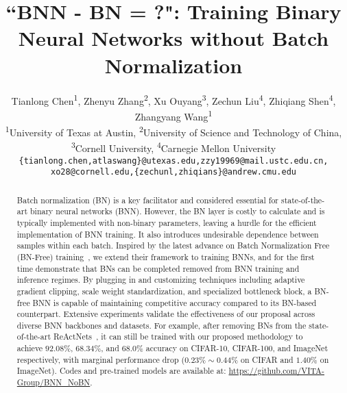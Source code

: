 \documentclass[final]{cvpr}
\newcommand{\PaperTitle}{``BNN - BN = ?": Training Binary Neural Networks without Batch Normalization}
\begin{document}
\title{\PaperTitle}

\author{Tianlong Chen\textsuperscript{1}, Zhenyu Zhang\textsuperscript{2}, Xu Ouyang\textsuperscript{3}, Zechun Liu\textsuperscript{4}, Zhiqiang Shen\textsuperscript{4}, Zhangyang Wang\textsuperscript{1}\\
  \textsuperscript{1}University of Texas at Austin, \textsuperscript{2}University of Science and Technology of China, \\ \textsuperscript{3}Cornell University, \textsuperscript{4}Carnegie Mellon University \\
  \small{\texttt{\{tianlong.chen,atlaswang\}@utexas.edu,zzy19969@mail.ustc.edu.cn,}} \\
  \small{\texttt{xo28@cornell.edu,\{zechunl,zhiqians\}@andrew.cmu.edu}}
}

\maketitle

\begin{abstract}
Batch normalization (BN) is a key facilitator and considered 
essential for state-of-the-art binary neural networks (BNN). However, the BN layer is costly to calculate and is typically implemented with non-binary parameters, leaving a hurdle for the efficient implementation of BNN training. It also introduces undesirable dependence between samples within each batch. Inspired by the latest advance on Batch Normalization Free (BN-Free) training~\cite{brock2021agc}, we extend their framework to training BNNs, and for the first time demonstrate that BNs can be completed removed from BNN training and inference regimes. By plugging in and customizing techniques including adaptive gradient clipping, scale weight standardization, and specialized bottleneck block, a BN-free BNN is capable of maintaining competitive accuracy compared to its BN-based counterpart. Extensive experiments validate the effectiveness of our proposal across diverse BNN backbones and datasets. For example, after removing BNs from the state-of-the-art ReActNets~\cite{liu2020reactnet}, it can still be trained with our proposed methodology to achieve $92.08\%$, $68.34\%$, and $68.0\%$ accuracy on CIFAR-10, CIFAR-100, and ImageNet respectively, with marginal performance drop ($0.23\%\sim0.44\%$ on CIFAR and $1.40\%$ on ImageNet). Codes and pre-trained models are available at: \small{\url{https://github.com/VITA-Group/BNN_NoBN}}.
\vspace{-1em}
\end{abstract}
\end{document}
